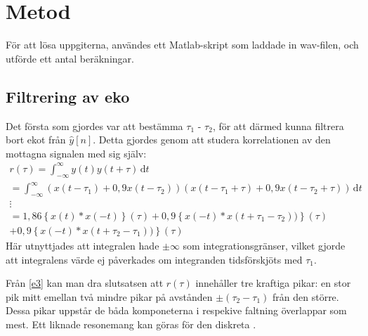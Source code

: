 \documentclass[10pt,twocolumn]{article}
\begin{document}
\section{Metod}

För att lösa uppgiterna, användes ett Matlab-skript som laddade in wav-filen,
och utförde ett antal beräkningar.
\subsection{Filtrering av eko}

Det första som gjordes var att bestämma $\tau_1$ - $\tau_2$, för att därmed
kunna filtrera bort ekot från $\hat{y}[n]$. Detta gjordes genom att studera korrelationen
av den mottagna signalen med sig själv:
\begin{multline}
    r(\tau) = \int_{-\infty}^{\infty}\!y(t)y(t+\tau)\, \mathrm{d}t \\ 
    = \int_{-\infty}^{\infty}\!(x(t-\tau_1)+0,9 x(t-\tau_2))(x(t-\tau_1+\tau)+0,9 x(t-\tau_2+\tau))\, \mathrm{d}t \\
    \vdots \\
    = 1,86\left\{x(t) \ast x(-t)\right\}(\tau) + 
    0,9\left\{x(-t) \ast x(t+\tau_1-\tau_2))\right\}(\tau)\\ + 
    0,9\left\{x(-t) \ast x(t+\tau_2-\tau_1))\right\}(\tau)
    \label{e3}
\end{multline}
Här utnyttjades att integralen hade $\pm\infty$ som integrationsgränser, vilket gjorde att integralens värde ej
påverkades om integranden tidsförskjöts med $\tau_1$.

Från \ref{e3} kan man dra slutsatsen att $r(\tau)$ innehåller tre kraftiga pikar: en stor pik mitt emellan två mindre
pikar på avstånden $\pm(\tau_2 - \tau_1)$ från den större. Dessa pikar uppstår de båda komponeterna i respekive faltning
överlappar som mest. Ett liknade resonemang kan göras för den diskreta \yhat.
\end{document}
